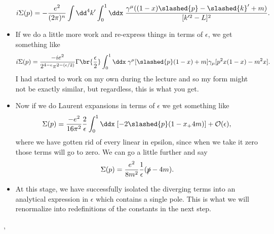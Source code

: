 \begin{itemize}
        \begin{equation*}
            i\Sigma(p) = -\frac{e^2}{(2\pi)^n} \int \dd^4k' \int_0^1 \ddx \; \frac{\gamma^{\mu}((1-x)\slashed{p} - \slashed{k}' + m)}{[k^{\prime2} - L]^2}.
        \end{equation*}
    \item If we do a little more work and re-express things in terms of $\epsilon$, we get something like
        \begin{equation*}
            i\Sigma(p) = \frac{-ie^2}{2^{4-\epsilon} \pi^{2 - (\epsilon/2)}} \Gamma\br{\frac{\epsilon}{2}} \int_0^1 \ddx \; \gamma^{\mu}[\slashed{p}(1-x) + m]\gamma_{\mu}[p^2x(1-x) - m^2x].
        \end{equation*}
        I had started to work on my own during the lecture and so my form might not be exactly similar, but regardless, this is what you get.
    \item Now if we do Laurent expansions in terms of $\epsilon$ we get something like
        \begin{equation*}
            \Sigma(p) = \frac{-e^2}{16\pi^2} \frac{2}{\epsilon} \int_0^1 \ddx \; [-2\slashed{p}(1-x_ + 4m)] + \mathcal{O}(\epsilon),
        \end{equation*}
        where we have gotten rid of every linear in epsilon, since when we take it zero those terms will go to zero. We can go a little further and say
        \begin{equation*}
            \Sigma(p) = \frac{e^2}{8m^2} \frac{1}{\epsilon} (\slashed{p} - 4m).
        \end{equation*}
    \item At this stage, we have successfully isolated the diverging terms into an analytical expression in $\epsilon$ which contains a single pole. This is what we will renormalize into redefinitions of the constants in the next step.
\end{itemize}



\sep


